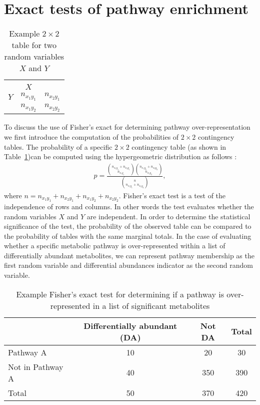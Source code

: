 \section{Exact tests of pathway enrichment}
\begin{table}
		\caption[$2 \times 2 $ table]{Example $2 \times 2$ table for two random variables $X$ and $Y$ \label{tab:twoByTwo} }
	\centering
	\begin{tabular}{l  | c  c}
		& & \\
		 &	$X$ & \\
		\hline
		$Y$ & $n_{x_1 y_1}$ & $n_{x_2 y_1}$ \\
		& $n_{x_1 y_2}$ & $n_{x_2 y_2}$ \\
	\end{tabular}
\end{table}
To discuss the use of Fisher's exact for determining pathway over-representation we first introduce the computation of the probabilities of $2 \times 2$ contingency tables. The probability of a specific $2\times 2$ contingency table (as shown in Table~\ref{tab:twoByTwo})can be computed using the hypergeometric distribution as follows \cite{agresti2013}:
\begin{align}
	p = \frac{{n_{x_1 y_1}+n_{x_2 y_1}\choose n_{x_1 y_1}} {n_{x_1 y_2}+n_{x_2 y_2}\choose n_{x_1 y_2}} }{{n\choose n_{x_1 y_1}+n_{x_1 y_2}}},
\end{align}
where $n=n_{x_1 y_1}+  n_{x_2 y_1} +n_{x_1 y_2}+n_{x_2 y_2}$. Fisher's exact test is a test of the independence of rows and columns. In other words the test evaluates whether the random variables $X$ and $Y$ are independent. In order to determine the statistical significance of the test, the probability of the observed table can be compared to the probability of tables with the same marginal totals. In the case of evaluating whether a specific metabolic pathway is over-represented within a list of differentially abundant metabolites, we can represent pathway membership as the first random variable and differential abundances indicator as the second random variable. 
\begin{table}[h!]
	\caption[Exact test]{Example Fisher's exact test for determining if a pathway is over-represented in a list of significant metabolites \label{tab:pathExact} }
	\begin{center}
		\begin{tabular}{ l c c c }
			\hline
			& Differentially abundant (DA) & Not DA & Total \\
			\hline
			Pathway A & 10 & 20 & 30 \\
			Not in Pathway A & 40 & 350 &  390 \\
			Total & 50 & 370 & 420\\
			\hline
		\end{tabular}
	\end{center}
\end{table}
